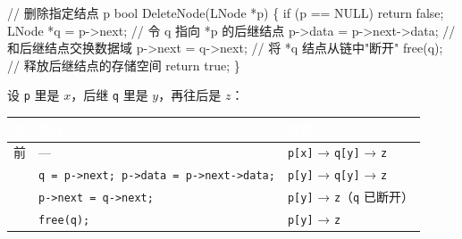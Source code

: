 \documentclass[10.5pt,a4paper,oneside]{article}
\newenvironment{Shaded}{}{}
\newcommand{\CommentTok}[1]{\textcolor[rgb]{0.18,0.55,0.23}{#1}}
\newcommand{\ControlFlowTok}[1]{\textcolor[rgb]{0.12,0.31,0.71}{#1}}
\newcommand{\DataTypeTok}[1]{\textcolor[rgb]{0.12,0.31,0.71}{#1}}
\newcommand{\KeywordTok}[1]{\textcolor[rgb]{0.12,0.31,0.71}{#1}}
\newcommand{\NormalTok}[1]{#1}
\newcommand{\OperatorTok}[1]{\textcolor[rgb]{0.20,0.20,0.20}{#1}}
\begin{document}
\begin{Shaded}
\begin{Highlighting}[]
\CommentTok{// 删除指定结点 p}
\DataTypeTok{bool}\NormalTok{ DeleteNode}\OperatorTok{(}\NormalTok{LNode }\OperatorTok{*}\NormalTok{p}\OperatorTok{)} \OperatorTok{\{}
    \ControlFlowTok{if} \OperatorTok{(}\NormalTok{p }\OperatorTok{==}\NormalTok{ NULL}\OperatorTok{)}
        \ControlFlowTok{return} \KeywordTok{false}\OperatorTok{;}
\NormalTok{    LNode }\OperatorTok{*}\NormalTok{q }\OperatorTok{=}\NormalTok{ p}\OperatorTok{{-}\textgreater{}}\NormalTok{next}\OperatorTok{;}         \CommentTok{// 令 q 指向 *p 的后继结点}
\NormalTok{    p}\OperatorTok{{-}\textgreater{}}\NormalTok{data }\OperatorTok{=}\NormalTok{ p}\OperatorTok{{-}\textgreater{}}\NormalTok{next}\OperatorTok{{-}\textgreater{}}\NormalTok{data}\OperatorTok{;}    \CommentTok{// 和后继结点交换数据域}
\NormalTok{    p}\OperatorTok{{-}\textgreater{}}\NormalTok{next }\OperatorTok{=}\NormalTok{ q}\OperatorTok{{-}\textgreater{}}\NormalTok{next}\OperatorTok{;}          \CommentTok{// 将 *q 结点从链中"断开"}
\NormalTok{    free}\OperatorTok{(}\NormalTok{q}\OperatorTok{);}                    \CommentTok{// 释放后继结点的存储空间}
    \ControlFlowTok{return} \KeywordTok{true}\OperatorTok{;}
\OperatorTok{\}}
\end{Highlighting}
\end{Shaded}

设 \texttt{p} 里是 \(x\)，后继 \texttt{q} 里是 \(y\)，再往后是 \(z\)：

{
\begin{xltabular}{\linewidth}{>{\hsize\raggedright\arraybackslash}X>{\hsize\raggedright\arraybackslash}X>{\hsize\raggedright\arraybackslash}X}
\textcolor{white}{\bfseries 步} & \textcolor{white}{\bfseries 执行} & \textcolor{white}{\bfseries 链表} \\
\endfirsthead
前 & --- & \texttt{p{[}x{]}} → \texttt{q{[}y{]}} → \texttt{z} \\  & \texttt{q\ =\ p-\textgreater{}next;\ p-\textgreater{}data\ =\ p-\textgreater{}next-\textgreater{}data;} & \texttt{p{[}y{]}} → \texttt{q{[}y{]}} → \texttt{z} \\  & \texttt{p-\textgreater{}next\ =\ q-\textgreater{}next;} & \texttt{p{[}y{]}} → \texttt{z}（\texttt{q} 已断开） \\  & \texttt{free(q);} & \texttt{p{[}y{]}} → \texttt{z} \\ \hline
\end{xltabular}\par\vspace{4pt}}
\end{document}
